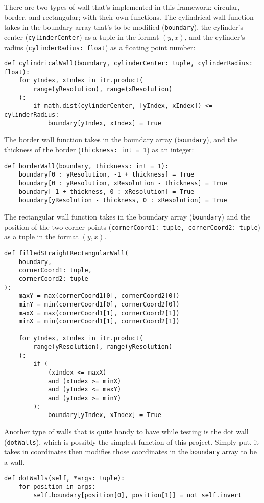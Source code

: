 There are two types of wall that's implemented in this framework: circular, border, and rectangular; with their own functions. The cylindrical wall function takes in the boundary array that's to be modified (\texttt{boundary}), the cylinder's center (\texttt{cylinderCenter}) as a tuple in the format $(y, x)$, and the cylinder's radius (\texttt{cylinderRadius: float}) as a floating point number:
\begin{verbatim}
def cylindricalWall(boundary, cylinderCenter: tuple, cylinderRadius: float):
    for yIndex, xIndex in itr.product(
        range(yResolution), range(xResolution)
    ):
        if math.dist(cylinderCenter, [yIndex, xIndex]) <= cylinderRadius:
            boundary[yIndex, xIndex] = True
\end{verbatim}
The border wall function takes in the boundary array (\texttt{boundary}), and the thickness of the border (\texttt{thickness: int = 1}) as an integer:
\begin{verbatim}
def borderWall(boundary, thickness: int = 1):
    boundary[0 : yResolution, -1 + thickness] = True
    boundary[0 : yResolution, xResolution - thickness] = True
    boundary[-1 + thickness, 0 : xResolution] = True
    boundary[yResolution - thickness, 0 : xResolution] = True
\end{verbatim}
The rectangular wall function takes in the boundary array (\texttt{boundary}) and the position of the two corner points (\texttt{cornerCoord1: tuple, cornerCoord2: tuple}) as a tuple in the format $(y, x)$.
\begin{verbatim}
def filledStraightRectangularWall(
    boundary,
    cornerCoord1: tuple,
    cornerCoord2: tuple
):
    maxY = max(cornerCoord1[0], cornerCoord2[0])
    minY = min(cornerCoord1[0], cornerCoord2[0])
    maxX = max(cornerCoord1[1], cornerCoord2[1])
    minX = min(cornerCoord1[1], cornerCoord2[1])

    for yIndex, xIndex in itr.product(
        range(yResolution), range(yResolution)
    ):
        if (
            (xIndex <= maxX)
            and (xIndex >= minX)
            and (yIndex <= maxY)
            and (yIndex >= minY)
        ):
            boundary[yIndex, xIndex] = True
\end{verbatim}

Another type of walls that is quite handy to have while testing is the dot wall (\texttt{dotWalls}), which is possibly the simplest function of this project. Simply put, it takes in coordinates then modifies those coordinates in the \texttt{boundary} array to be a wall.
\begin{verbatim}
def dotWalls(self, *args: tuple):
    for position in args:
        self.boundary[position[0], position[1]] = not self.invert
\end{verbatim}

